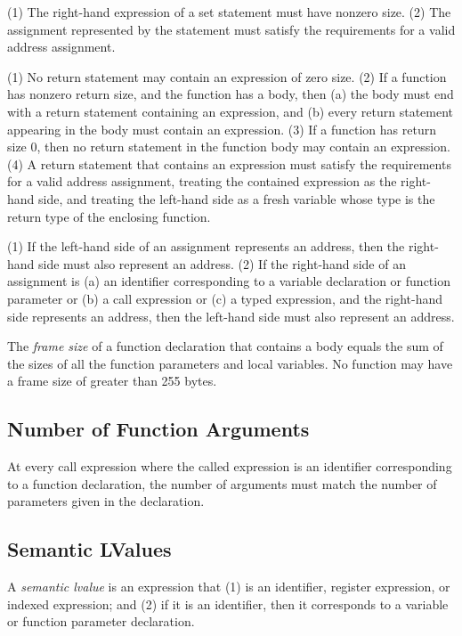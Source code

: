\documentclass[10pt]{article}
\begin{document}
 (1) The right-hand expression of a set
statement must have nonzero size.  (2) The assignment represented by
the statement must satisfy the requirements for a valid address
assignment.

 (1) No return statement may contain an
expression of zero size.  (2) If a function has nonzero return size,
and the function has a body, then (a) the body must end with a return
statement containing an expression, and (b) every return statement
appearing in the body must contain an expression.  (3) If a function
has return size 0, then no return statement in the function body may
contain an expression. (4) A return statement that contains an
expression must satisfy the requirements for a valid address
assignment, treating the contained expression as the right-hand side,
and treating the left-hand side as a fresh variable whose type is the
return type of the enclosing function.

 (1) If the left-hand side of an
assignment represents an address, then the right-hand side must also
represent an address. (2) If the right-hand side of an assignment is
(a) an identifier corresponding to a variable declaration or function
parameter or (b) a call expression or (c) a typed expression, and the
right-hand side represents an address, then the left-hand side must
also represent an address.

 The \emph{frame size} of a function
declaration that contains a body equals the sum of the sizes of all
the function parameters and local variables.  No function may have a
frame size of greater than 255 bytes.

\subsection{Number of Function Arguments}
\label{sec:semantics:fn-args}

At every call expression where the called expression is an identifier
corresponding to a function declaration, the number of arguments must
match the number of parameters given in the declaration.

\subsection{Semantic LValues}
\label{sec:semantics:lvalues}

  A \emph{semantic lvalue} is
an expression that (1) is an identifier, register expression, or
indexed expression; and (2) if it is an identifier, then it
corresponds to a variable or function parameter declaration.
\end{document}
